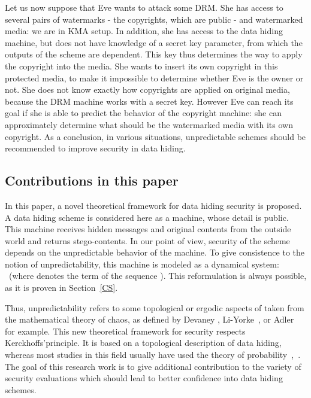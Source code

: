 \documentclass{llncs}
\begin{document}
Let us now suppose that Eve wants to attack some DRM. She has access to several pairs of watermarks - the copyrights, which are public - and watermarked media: we are in KMA setup. In addition, she has access to the data hiding machine, but does not have knowledge of a secret key parameter, from which the outputs of the scheme are dependent. This key thus determines the way to apply the copyright into the media. She wants to insert its own copyright in this protected media, to make it impossible to determine whether Eve is the owner or not. She does not know exactly how copyrights are applied on original media, because the DRM machine works with a secret key. However Eve can reach its goal if she is able to predict the behavior of the copyright machine: she can approximately determine what should be the watermarked media with its own copyright. As a conclusion, in various situations, unpredictable schemes should be recommended to improve security in data hiding. 



\subsection{Contributions in this paper}
\label{contrib}
In this paper, a novel theoretical framework for data hiding security is proposed. A data hiding scheme is considered here as a machine, whose detail is public. This machine receives hidden messages and original contents from the outside world and returns stego-contents. In our point of view, security of the scheme depends on the unpredictable behavior of the machine. To give consistence to the notion of unpredictability, this machine is modeled as a dynamical system:  ~(where  denotes the  term of the sequence ). This reformulation is always possible, as it is proven in Section~\ref{CS}. 


Thus, unpredictability refers to some topological or ergodic aspects of  taken from the mathematical theory of chaos, as defined by Devaney \cite{Devaney}, Li-Yorke~\cite{Li75}, or Adler~\cite{Adler65} for example. This new theoretical framework for security respects Kerckhoffs'principle. It is based on a topological description of data hiding, whereas most studies in this field usually have used the theory of probability~\cite{Perez-Freire06},~\cite{Furon05}. The goal of this research work is to give additional contribution to the variety of security evaluations which should lead to better confidence into data hiding schemes.
\end{document}
